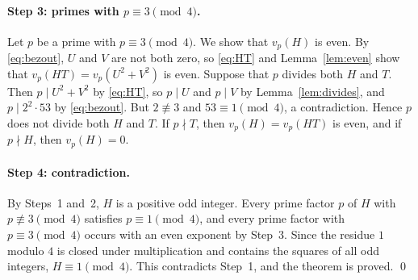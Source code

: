 \documentclass[11pt]{article}
\begin{document}
\paragraph{Step 3: primes with $p\equiv3\pmod4$.} Let $p$ be a prime with $p\equiv3\pmod4$. We show that $v_p(H)$ is even. By \eqref{eq:bezout}, $U$ and $V$ are not both zero, so \eqref{eq:HT} and Lemma~\ref{lem:even} show that $v_p(HT)=v_p(U^2+V^2)$ is even. Suppose that $p$ divides both $H$ and $T$. Then $p\mid U^2+V^2$ by \eqref{eq:HT}, so $p\mid U$ and $p\mid V$ by Lemma~\ref{lem:divides}, and $p\mid 2^2\cdot53$ by \eqref{eq:bezout}. But $2\not\equiv3$ and $53\equiv1\pmod4$, a contradiction. Hence $p$ does not divide both $H$ and $T$. If $p\nmid T$, then $v_p(H)=v_p(HT)$ is even, and if $p\nmid H$, then $v_p(H)=0$.

\paragraph{Step 4: contradiction.} By Steps~1 and~2, $H$ is a positive odd integer. Every prime factor $p$ of $H$ with $p\not\equiv3\pmod4$ satisfies $p\equiv1\pmod4$, and every prime factor with $p\equiv3\pmod4$ occurs with an even exponent by Step~3. Since the residue $1$ modulo $4$ is closed under multiplication and contains the squares of all odd integers, $H\equiv1\pmod4$. This contradicts Step~1, and the theorem is proved.
\qed
\end{document}
